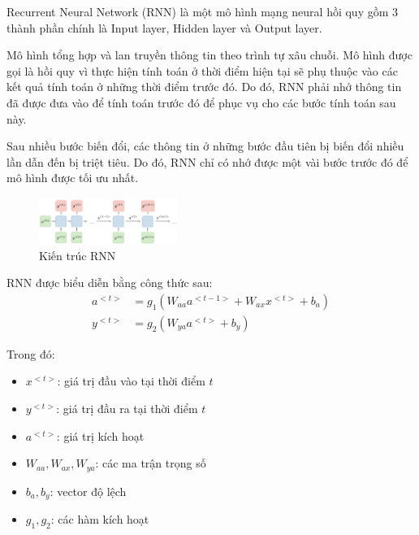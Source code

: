 Recurrent Neural Network (RNN) là một mô hình mạng neural hồi quy gồm 3 thành phần chính là Input layer, Hidden layer và Output layer.

Mô hình tổng hợp và lan truyền thông tin theo trình tự xâu chuỗi. Mô hình được gọi là hồi quy vì thực hiện tính toán ở thời điểm hiện tại sẽ phụ thuộc vào các kết quả tính toán ở những thời điểm trước đó. Do đó, RNN phải nhớ thông tin đã được đưa vào để tính toán trước đó để phục vụ cho các bước tính toán sau này.

Sau nhiều bước biến đổi, các thông tin ở những bước đầu tiên bị biến đổi nhiều lần dẫn đến bị triệt tiêu. Do đó, RNN chỉ có nhớ được một vài bước trước đó để mô hình được tối ưu nhất.

\begin{figure}[htbp]
\centerline{\includegraphics[width=0.4\textwidth]{img/RNN.png}}
\caption{Kiến trúc RNN}
\label{fig}
\end{figure}

RNN được biểu diễn bằng công thức sau:
\begin{align}
    a^{<t>} &= g_1(W_{aa}a^{<t-1>} + W_{ax}x^{<t>} + b_a) \\
    y^{<t>} &= g_2(W_{ya}a^{<t>} + b_y)
\end{align}

Trong đó:
\begin{itemize}
    \item $x^{<t>}$: giá trị đầu vào tại thời điểm $t$
    \item $y^{<t>}$: giá trị đầu ra tại thời điểm $t$
    \item $a^{<t>}$: giá trị kích hoạt
    \item $W_{aa}, W_{ax}, W_{ya}$: các ma trận trọng số
    \item $b_a, b_y$: vector độ lệch
    \item $g_1, g_2$: các hàm kích hoạt
\end{itemize}